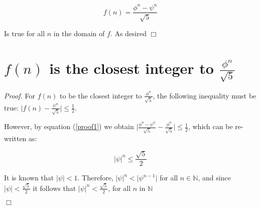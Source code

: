 \documentclass[13pt]{article}
\begin{document}
\begin{equation}
	f(n) = \frac{\phi ^{n} - \psi ^{n} }{\sqrt{5}} \label{proof1}
\end{equation}

Is true for all \( n \) in the domain of \( f \). As desired 
\hfill\(\Box\)

\section*{\( f(n) \) is the closest integer to \( \frac{\phi ^{n}
}{\sqrt{5}} \)}

\emph{Proof.} For \( f(n) \) to be the closest integer to \(
\frac{\phi ^{n}}{\sqrt{5}} \), the following inequality must be true:
\( \vert f(n) - \frac{\psi ^{n}}{\sqrt{5}} \vert \leq \frac{1}{2} \).

However, by equation (\ref{proof1}) we obtain \( \vert \frac{\phi ^{n}
- \psi ^{n} }{\sqrt{5}} - \frac{\phi ^{n}}{\sqrt{5}} \vert \leq
\frac{1}{2} \), which can be re-written as:

\begin{equation}
	\vert \psi \vert ^{n} \leq \frac{\sqrt{5}}{2} 
\end{equation}

It is known that \( \vert \psi \vert < 1 \). Therefore, \( \vert \psi \vert ^{n} < \vert
\psi ^{n-1} \vert \) for all \( n \in \mathbb{N} \), and since \( \vert
\psi \vert < \frac{\sqrt{5}}{2}\) it follows that \( \vert \psi
\vert ^{n}  < \frac{\sqrt{5}}{2} \), for all \( n \) in \(
\mathbb{N} \) 

\hfill$\Box$
\end{document}
